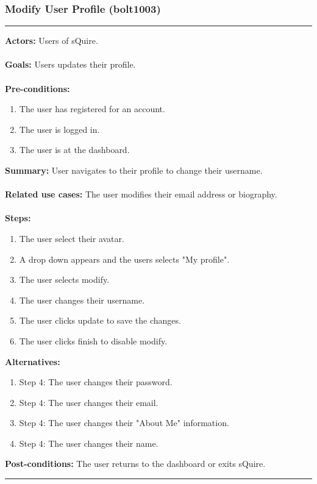\documentclass[11pt]{report}
\begin{document}
\subsubsection{Modify User Profile (bolt1003)}
\vspace{2pt}
\hrule
\vspace{8pt}
 \textbf{Actors:} Users of sQuire. \\ \\
\textbf{Goals:} Users updates their profile. \\ \\
 \textbf{Pre-conditions:} \begin{enumerate}
  \item The user has registered for an account.
  \item The user is logged in.
  \item The user is at the dashboard.
 \end{enumerate}
 \textbf{Summary:} User navigates to their profile to change their username.\\ \\
\textbf{Related use cases:} The user modifies their email address or biography. \\ \\
\textbf{Steps:} \begin{enumerate}
  \item The user select their avatar.
  \item A drop down appears and the users selects "My profile".
  \item The user selects modify. 
  \item The user changes their username.
  \item The user clicks update to save the changes.
  \item The user clicks finish to disable modify.
 \end{enumerate}
 \textbf{Alternatives:} \begin{enumerate} 
  \item Step 4: The user changes their password.
  \item Step 4: The user changes their email.
  \item Step 4: The user changes their "About Me" information.
  \item Step 4: The user changes their name.
 \end{enumerate}
 \textbf{Post-conditions:} The user returns to the dashboard or exits sQuire. \\
\vspace{8pt}
\hrule
\newpage
\end{document}

